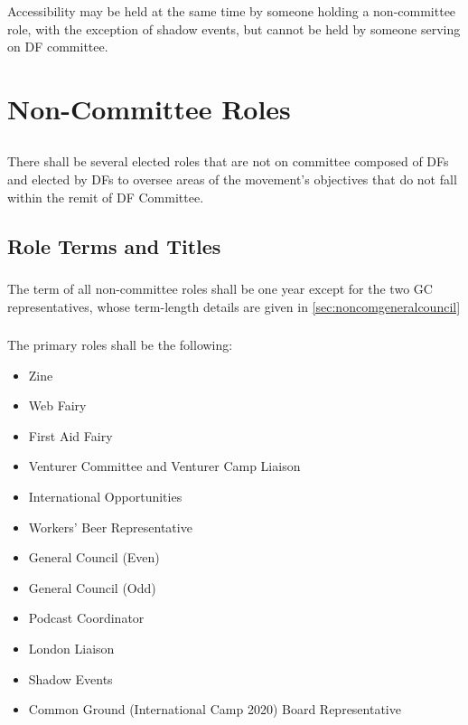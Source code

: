 \documentclass[a4paper, 11pt]{report}
\begin{document}
\subsubsection{}
Accessibility may be held at the same time by someone holding a non-committee role, with the exception of shadow events, but cannot be held by someone serving on DF committee.


\section{Non-Committee Roles}
\subsection{}
There shall be several elected roles that are not on committee composed of DFs and elected by DFs to oversee areas of the movement’s objectives that do not fall within the remit of DF Committee.
\subsection{Role Terms and Titles}
\subsubsection{}
The term of all non-committee roles shall be one year except for the two GC representatives, whose term-length details are given in \ref{sec:noncomgeneralcouncil}
\subsubsection{} The primary roles shall be the following:

\begin{itemize}
\item Zine
\item Web Fairy
\item First Aid Fairy
\item Venturer Committee and Venturer Camp Liaison
\item International Opportunities
\item Workers' Beer Representative
\item General Council (Even)
\item General Council (Odd)
\item Podcast Coordinator
\item London Liaison
\item Shadow Events
\item Common Ground (International Camp 2020) Board Representative
\end{itemize}
\end{document}
